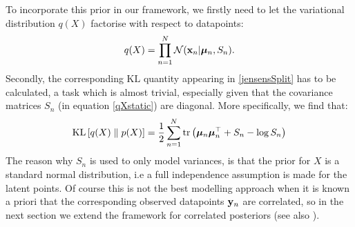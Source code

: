 
To incorporate this prior in our framework, we firstly need to let the variational distribution $q(X)$
factorise with respect to datapoints:
\begin{equation}
  \label{qXstatic}
  q(X) = \prod_{n=1}^N \mathcal{N}(\mathbf{x}_n | \boldsymbol \mu_n, S_n).
\end{equation} 
Secondly, the corresponding $\text{KL}$ quantity appearing in \eqref{jensensSplit}  has to be calculated, a task which is
almost trivial, especially given that the covariance matrices $S_n$ (in equation \eqref{qXstatic}) are diagonal. 
More specifically, we find that:
\begin{equation}
\label{KLstatic}
\text{KL} \left[ q(X) \parallel p(X) \right] = 
	\frac{1}{2} \sum_{n=1}^N \text{tr} \left( \boldsymbol \mu_n \boldsymbol \mu_n^{\top} + S_n - \log S_n \right)
\end{equation}
The reason why $S_n$ is used to only model variances, is
that the prior for $X$ is a standard normal distribution, i.e a full independence assumption is made for the latent points.
Of course this is not the best modelling approach when it is known a priori that the corresponding observed datapoints $\mathbf{y}_n$
are correlated,
so in the next section we extend the framework for correlated posteriors (see also \cite{Damianou:vgpds11}).






